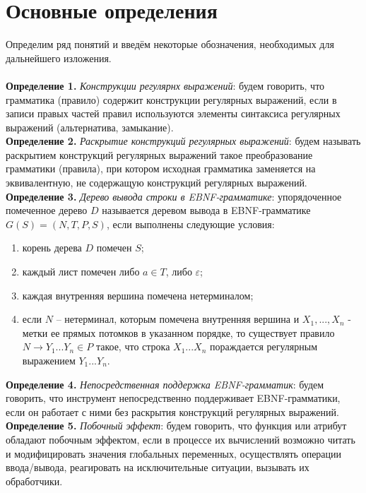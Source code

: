 \section{Основные определения}

Определим ряд понятий и введём некоторые обозначения, необходимых для дальнейшего изложения.
\\
\\
	{\bfseries Определение 1.} \textit{Конструкции регулярнх выражений}: будем говорить, что грамматика (правило) содержит конструкции регулярных выражений, если в записи правых частей правил используются элементы синтаксиса регулярных выражений (альтернатива, замыкание).
\\
	{\bfseries Определение 2.} \textit{Раскрытие конструкций регулярных выражений}: будем называть раскрытием конструкций регулярных выражений такое преобразование грамматики (правила), при котором исходная грамматика заменяется на эквивалентную, не содержащую конструкций регулярных выражений.
\\
	{\bfseries Определение 3.} \textit{Дерево вывода строки в EBNF-грамматике}: упорядоченное помеченное дерево $D$ называется деревом вывода в EBNF-грамматике $G(S)=(N,T,P,S)$, если выполнены следующие условия:

\begin{enumerate}
	\item корень дерева $D$ помечен $S$;
	\item каждый лист помечен либо $a \in T$, либо $\varepsilon$;
	\item каждая внутренняя вершина помечена нетерминалом;
	\item если $N$ -- нетерминал, которым помечена внутренняя вершина и $X_1,...,X_n$ - метки ее прямых потомков в указанном порядке, то существует правило $N \rightarrow Y_1...Y_n \in P$ такое, что строка $X_1...X_n$ пораждается регулярным выражением $Y_1...Y_n$.
\end{enumerate}
	{\bfseries Определение 4.} \textit{Непосредственная поддержка EBNF-грамматик}: будем говорить, что инструмент непосредственно поддерживает EBNF-грамматики, если он работает с ними без раскрытия конструкций регулярных выражений.
\\
 	{\bfseries Определение 5.} \textit{Побочный эффект}: будем говорить, что функция или атрибут обладают побочным эффектом, если в процессе их вычислений возможно читать и модифицировать значения глобальных переменных, осуществлять операции ввода/вывода, реагировать на исключительные ситуации, вызывать их обработчики.



